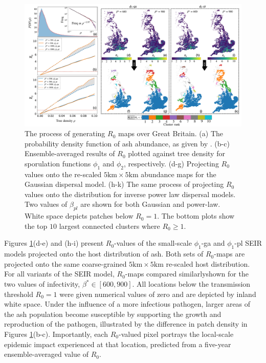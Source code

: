 \begin{landscape}
\begin{figure}
    \centering
    \includegraphics[scale=0.38]{chapter6/figures/fig6-R0-map-generation.pdf}
    \caption{The process of generating $R_0$ maps over Great Britain. (a) The probability density function of ash abundance, as given by \cite{hill.data}. (b-c) Ensemble-averaged results of $R_0$ plotted against tree density for sporulation functions $\phi_1$ and $\phi_2$, respectively. (d-g) Projecting  $R_0$ values onto the re-scaled $5\mathrm{km} \times 5 \mathrm{km}$ abundance maps for the Gaussian dispersal model. (h-k) The same process of projecting $R_0$ values onto the distribution for inverse power law dispersal models. Two values of $\beta_{pl}$ are shown for both Gaussian and power-law. White space depicts patches below $R_0 = 1$. The bottom plots show the top $10$ largest connected clusters where  $R_0 \geq 1 $.}
    \label{fig:R0-map-generation}
\end{figure}
\end{landscape}

Figures \ref{fig:R0-map-generation}(d-e) and (h-i) present $R_0$-values of the small-scale $\phi_1$-ga and $\phi_1$-pl SEIR models projected onto the host distribution of ash.
Both sets of $R_0$-maps are projected onto the same coarse-grained $5\mathrm{km} \times 5\mathrm{km}$ re-scaled host distribution.
For all variants of the SEIR model, $R_0$-maps compared similarly\textemdash shown for the two values of infectivity, $\beta^* \in [600, 900]$.
All locations below the transmission threshold $R_0=1$ were given numerical values of zero and are depicted by inland white space.
Under the influence of a more infectious pathogen, larger areas of the ash population become susceptible by supporting the growth and reproduction of the pathogen, illustrated by the difference in patch density in Figures \ref{fig:R0-map-generation}(b-c). 
Importantly, each $R_0$-valued pixel portrays the local-scale epidemic impact experienced at that location, predicted from a five-year ensemble-averaged value of $R_0$.

